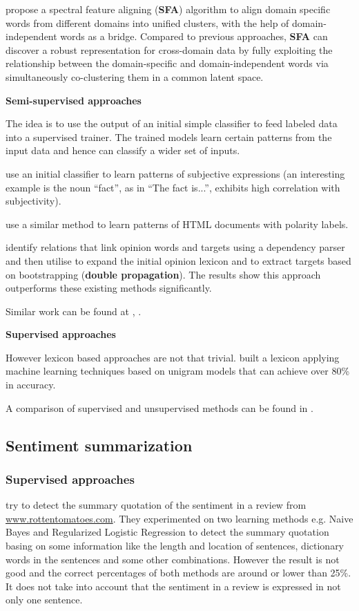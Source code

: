 \documentclass{article}
\begin{document}
\begin{multicols}{2}
            \citet{Pan2010} propose a spectral feature aligning (\textbf{SFA}) 
algorithm to align domain specific words from different domains into unified 
clusters, with the help of domain-independent words as a bridge. Compared to 
previous approaches, \textbf{SFA} can discover a robust representation for 
cross-domain data by fully exploiting the relationship between the domain-specific
and domain-independent words via simultaneously co-clustering them in a common
latent space.
      
        \textbf{Semi-supervised approaches}

          The idea is to use the output of an initial simple classifier to feed
  labeled data into a supervised trainer. The trained models learn
  certain patterns from the input data and hence can classify a wider set of
  inputs.

            \citet{Riloff2003} use an initial classifier to learn patterns
  of subjective expressions (an interesting example is the noun ``fact'', as in
  ``The fact is...'', exhibits high correlation with subjectivity).
            
            \citet{Kaji2006} use a similar method to learn patterns of HTML
  documents with polarity labels.
            
            \citet{Qiu2010} identify relations that link opinion words and targets
using a dependency parser and then utilise to expand the initial opinion lexicon
and to extract targets based on bootstrapping (\textbf{double propagation}).
The results show this approach outperforms these existing methods significantly.

            Similar work can be found at \cite{Wiebea2005}, \cite{Riloff2003a}.

        \textbf{Supervised approaches}
            
            However lexicon based approaches are not that trivial.
  \citet{Pang2002} built a lexicon applying machine learning techniques based on
  unigram models that can achieve over 80\% in accuracy.

            A comparison of supervised and unsupervised methods can be found in
  \cite{Chaovalit2005}.

  \subsection{Sentiment summarization}
    \subsubsection{Supervised approaches}
        \citet{Beineke2004} try to detect the summary quotation of the sentiment 
in a review from \url{www.rottentomatoes.com}. They experimented on two learning 
methods e.g. Naive Bayes and Regularized Logistic Regression to detect the summary
quotation basing on some information like the length and location of sentences,
dictionary words in the sentences and some other combinations. However the
result is not good and the correct percentages of both methods are around or
lower than 25\%. It does not take into account that the sentiment in a review is
expressed in not only one sentence.         


\end{multicols}
\end{document}

